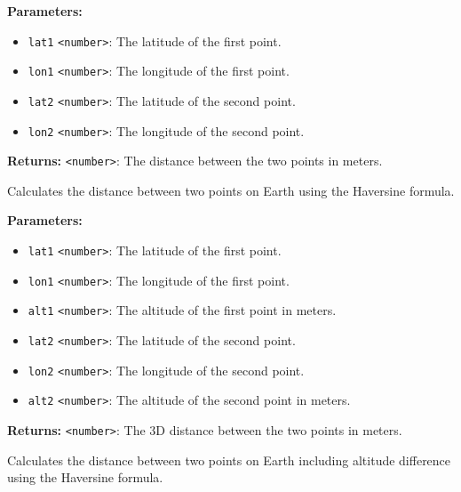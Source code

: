 \documentclass[12pt,a4paper]{article}
\begin{document}
\noindent \textbf{Parameters:}
\begin{itemize}
  \item \texttt{lat1} \texttt{<number>}: The latitude of the first point.
  \item \texttt{lon1} \texttt{<number>}: The longitude of the first point.
  \item \texttt{lat2} \texttt{<number>}: The latitude of the second point.
  \item \texttt{lon2} \texttt{<number>}: The longitude of the second point.
\end{itemize}

\noindent \textbf{Returns:} \texttt{<number>}: The distance between the two points in meters.

\noindent Calculates the distance between two points on Earth using the Haversine formula.

\vspace{5mm}
\noindent {}


\noindent \textbf{Parameters:}
\begin{itemize}
  \item \texttt{lat1} \texttt{<number>}: The latitude of the first point.
  \item \texttt{lon1} \texttt{<number>}: The longitude of the first point.
  \item \texttt{alt1} \texttt{<number>}: The altitude of the first point in meters.
  \item \texttt{lat2} \texttt{<number>}: The latitude of the second point.
  \item \texttt{lon2} \texttt{<number>}: The longitude of the second point.
  \item \texttt{alt2} \texttt{<number>}: The altitude of the second point in meters.
\end{itemize}

\noindent \textbf{Returns:} \texttt{<number>}: The 3D distance between the two points in meters.

\noindent Calculates the distance between two points on Earth including altitude difference using the Haversine formula.

\vspace{5mm}
\noindent {}
\end{document}
